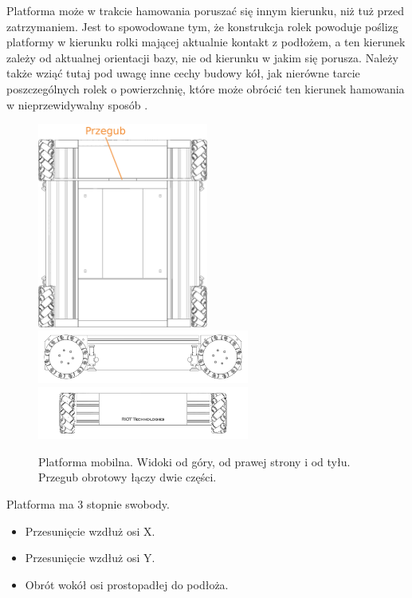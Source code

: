 	Platforma może w trakcie hamowania poruszać się innym kierunku, niż tuż przed zatrzymaniem.
	Jest to spowodowane tym, że konstrukcja rolek powoduje poślizg platformy w kierunku rolki mającej aktualnie kontakt z podłożem, a ten kierunek zależy od aktualnej
	orientacji bazy, nie od kierunku w jakim się porusza.
	Należy także wziąć tutaj pod uwagę inne cechy budowy kół, jak nierówne tarcie poszczególnych rolek o powierzchnię, 
	które może obrócić ten kierunek hamowania w nieprzewidywalny sposób \cite{braking}.

	\begin{figure}[H]
	\centering
	\includegraphics[width=0.5\textwidth]{graphics/base_top.png}
	\includegraphics[width=0.62\textwidth]{graphics/base_side.pdf}
	\includegraphics[width=0.62\textwidth]{graphics/base_front.pdf}
	\caption{Platforma mobilna. Widoki od góry, od prawej strony i od tyłu. Przegub obrotowy łączy dwie części.}
	\label{fig:base_ortho}
	\end{figure} 

	Platforma ma 3 stopnie swobody. 
	\begin{itemize}
		\item Przesunięcie wzdłuż osi X.
		\item Przesunięcie wzdłuż osi Y.
		\item Obrót wokół osi prostopadłej do podłoża.
	\end{itemize}

